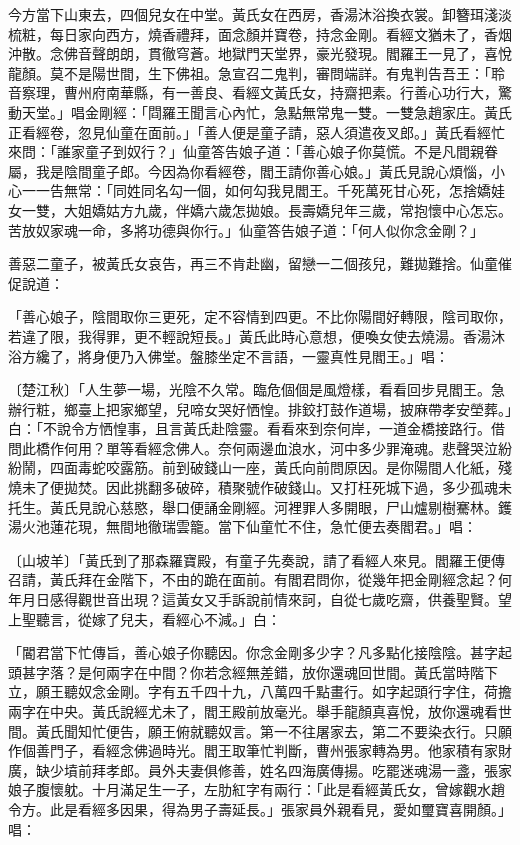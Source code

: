 今方當下山東去，四個兒女在中堂。黃氏女在西房，香湯沐浴換衣裳。卸簪珥淺淡梳粧，每日家向西方，燒香禮拜，面念顏并寶卷，持念金剛。看經文猶未了，香烟沖散。念佛音聲朗朗，貫徹穹蒼。地獄門天堂界，豪光發現。閻羅王一見了，喜悅龍顏。莫不是陽世間，生下佛祖。急宣召二鬼判，審問端詳。有鬼判告吾王：「聆音察理，曹州府南華縣，有一善良、看經文黃氏女，持齋把素。行善心功行大，驚動天堂。」唱金剛經：「閰羅王聞言心內忙，急點無常鬼一雙。一雙急趙家庄。黃氏正看經卷，忽見仙童在面前。」「善人便是童子請，惡人須遣夜叉郎。」黃氏看經忙來問：「誰家童子到奴行？」仙童答告娘子道：「善心娘子你莫慌。不是凡間親眷屬，我是陰間童子郎。今因為你看經卷，閻王請你善心娘。」黃氏見說心煩惱，小心一一告無常：「同姓同名勾一個，如何勾我見閻王。千死萬死甘心死，怎捨嬌娃女一雙，大姐嬌姑方九歲，伴嬌六歲怎拋娘。長壽嬌兒年三歲，常抱懷中心怎忘。苦放奴家魂一命，多將功德與你行。」仙童答告娘子道：「何人似你念金剛？」

善惡二童子，被黃氏女哀告，再三不肯赴幽，留戀一二個孩兒，難拋難捨。仙童催促說道：

「善心娘子，陰間取你三更死，定不容情到四更。不比你陽間好轉限，陰司取你，若違了限，我得罪，更不輕說短長。」黃氏此時心意想，便喚女使去燒湯。香湯沐浴方纔了，將身便乃入佛堂。盤膝坐定不言語，一靈真性見閻王。」唱：

〔楚江秋〕「人生夢一場，光陰不久常。臨危個個是風燈樣，看看回步見閻王。急辦行粧，鄉臺上把家鄉望，兒啼女哭好恓惶。排鉸打鼓作道場，披麻帶孝安塋葬。」白：「不說令方恓惶事，且言黃氏赴陰靈。看看來到奈何岸，一道金橋接路行。借問此橋作何用？單等看經念佛人。奈何兩邊血浪水，河中多少罪淹魂。悲聲哭泣紛紛鬧，四面毒蛇咬露筋。前到破錢山一座，黃氏向前問原因。是你陽間人化紙，殘燒未了便拋焚。因此挑翻多破碎，積聚號作破錢山。又打枉死城下過，多少孤魂未托生。黃氏見說心慈愍，舉口便誦金剛經。河裡罪人多開眼，尸山爐剔樹騫林。鑊湯火池蓮花現，無間地徹瑞雲籠。當下仙童忙不住，急忙便去奏閻君。」唱：

〔山坡羊〕「黃氏到了那森羅寶殿，有童子先奏說，請了看經人來見。閻羅王便傳召請，黃氏拜在金階下，不由的跪在面前。有閻君問你，從幾年把金剛經念起？何年月日感得觀世音出現？這黃女又手訴說前情來訶，自從七歲吃齋，供養聖賢。望上聖聽言，從嫁了兒夫，看經心不減。」白：

「閽君當下忙傳旨，善心娘子你聽因。你念金剛多少字？凡多點化接陰陰。甚字起頭甚字落？是何兩字在中間？你若念經無差錯，放你還魂回世間。黃氏當時階下立，願王聽奴念金剛。字有五千四十九，八萬四千點畫行。如字起頭行字住，荷擔兩字在中央。黃氏說經尤未了，閻王殿前放毫光。舉手龍顏真喜悅，放你還魂看世間。黃氏聞知忙便告，願王俯就聽奴言。第一不往屠家去，第二不要染衣行。只願作個善門子，看經念佛過時光。閻王取筆忙判斷，曹州張家轉為男。他家積有家財廣，缺少墳前拜孝郎。員外夫妻俱修善，姓名四海廣傳揚。吃罷迷魂湯一盞，張家娘子腹懷躭。十月滿足生一子，左肋紅字有兩行：「此是看經黃氏女，曾嫁觀水趙令方。此是看經多因果，得為男子壽延長。」張家員外親看見，愛如璽寶喜開顏。」唱：

